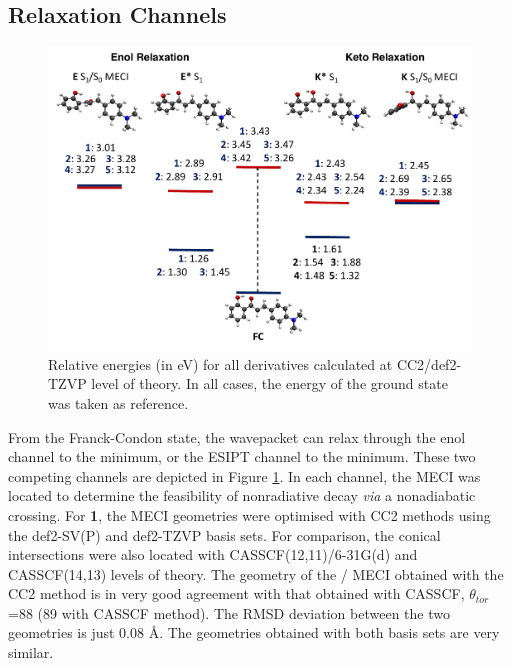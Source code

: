\subsection{Relaxation Channels}\label{section: NRdecay_Channels}
\begin{figure}
\centering
  \includegraphics[width=0.9\linewidth]{3nonradiativedecay/HC_Energy_Levels.pdf}
  \caption[\textbf{HC} energy levels]{Relative energies (in eV) for all derivatives calculated at CC2/def2-TZVP level of theory. In all cases, the energy of the ground state was taken as reference.}
  \label{figure: HC_Energy_Levels}
\end{figure}
From the Franck-Condon state, the wavepacket can relax through the enol channel to the \Estar{} minimum, or the ESIPT channel to the \Kstar{} minimum. These two competing channels are depicted in Figure \ref{figure: HC_Energy_Levels}. In each channel, the \ac{MECI} was located to determine the feasibility of nonradiative decay \textit{via} a nonadiabatic crossing. For \textbf{1}, the \ac{MECI} geometries were optimised with CC2 methods using the def2-SV(P) and def2-TZVP basis sets. For comparison, the conical intersections were also located with CASSCF(12,11)/6-31G(d) and CASSCF(14,13) levels of theory. The geometry of the \Kstar{} \sone/\szero{} \ac{MECI} obtained with the CC2 method is in very good agreement with that obtained with CASSCF, $\theta_{tor}$=88\textdegree{} (89\textdegree{} with CASSCF method). The RMSD deviation between the two geometries is just 0.08 \AA. The geometries obtained with both basis sets are very similar. 

